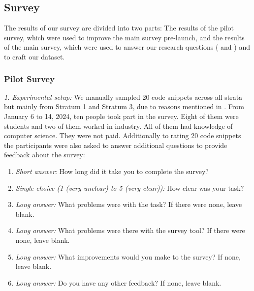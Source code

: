 \documentclass[%
class=scrreprt,
chapterprefix=false,%
open=right,%
twoside=false,%
paper=a4,%
logofile={Logo\_zentral\_farbig\_EN.png},%
thesistype=master,%
UKenglish,%
]{se2thesis}
\theoremstyle{definition}
\newcommand{\rdh}{REDEC\xspace}
\begin{document}
\subsection{Survey} \label{Survey}
	The results of our survey are divided into two parts: The results of the pilot survey, which were used to improve the main survey pre-launch, and the results of the main survey, which were used to answer our research questions ( and ) and to craft our dataset.
	
\subsubsection{Pilot Survey} \label{Pilot Survey}
	
	\textit{1. Experimental setup:}
	We manually sampled 20 code snippets across all strata but mainly from Stratum 1 and Stratum 3, due to reasons mentioned in . From January 6 to 14, 2024, ten people took part in the survey. Eight of them were students and two of them worked in industry. All of them had knowledge of computer science. They were not paid. Additionally to rating 20 code snippets the participants were also asked to answer additional questions to provide feedback about the survey:
	
	\begin{enumerate}
		\item \textit{Short answer}: How long did it take you to complete the survey?
		\item \textit{Single choice (1 (very unclear) to 5 (very clear)):} How clear was your task?
		\item \textit{Long answer:} What problems were with the task? If there were none, leave blank.
		\item \textit{Long answer:} What problems were there with the survey tool? If there were none, leave blank.
		\item \textit{Long answer:} What improvements would you make to the survey? If none, leave blank.
		\item \textit{Long answer:} Do you have any other feedback? If none, leave blank.
	\end{enumerate}
	
	
	
\end{document}
